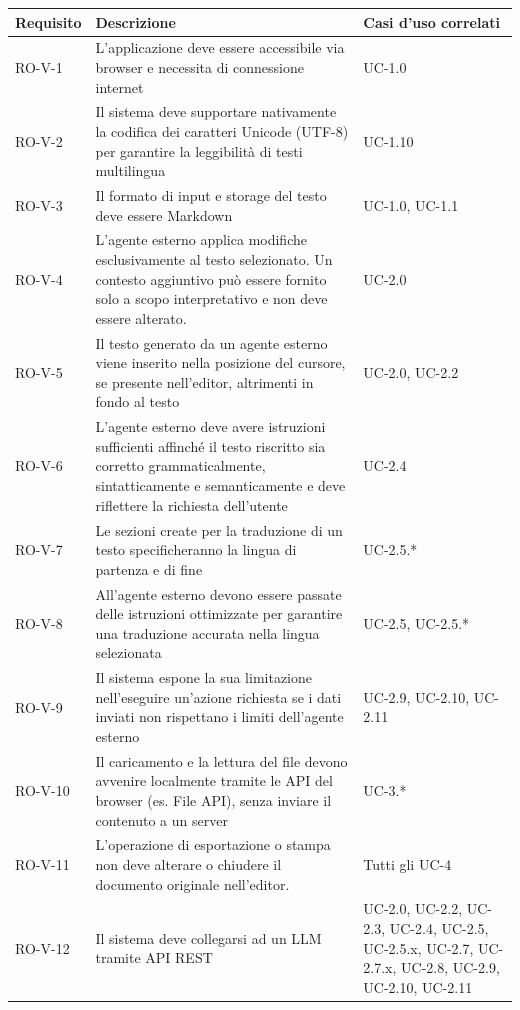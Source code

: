\documentclass[11pt,a4paper]{article}
\begin{document}
\begin{longtable}{|p{}|>{\raggedright\arraybackslash}p{}|p{}|}
\hline
\textbf{Requisito} & \textbf{Descrizione} & \textbf{Casi d'uso correlati}\\
\hline

RO-V-1 & L'applicazione deve essere accessibile via browser e necessita di connessione internet & UC-1.0 \\
\hline
RO-V-2 & Il sistema deve supportare nativamente la codifica dei caratteri Unicode (UTF-8) per garantire la leggibilità di testi multilingua & UC-1.10 \\
\hline
RO-V-3 & Il formato di input e storage del testo deve essere Markdown & UC-1.0, UC-1.1 \\
\hline
RO-V-4 & L’agente esterno applica modifiche esclusivamente al testo selezionato. Un contesto aggiuntivo può essere fornito solo a scopo interpretativo e non deve essere alterato. & UC-2.0 \\
\hline
RO-V-5 & Il testo generato da un agente esterno viene inserito nella posizione del cursore, se presente nell’editor, altrimenti in fondo al testo & UC-2.0, UC-2.2 \\
\hline
RO-V-6 & L'agente esterno deve avere istruzioni sufficienti affinché il testo riscritto sia corretto grammaticalmente, sintatticamente e semanticamente e deve riflettere la richiesta dell'utente & UC-2.4 \\
\hline
RO-V-7 & Le sezioni create per la traduzione di un testo specificheranno la lingua di partenza e di fine & UC-2.5.* \\
\hline
RO-V-8 & All'agente esterno devono essere passate delle istruzioni ottimizzate per garantire una traduzione accurata nella lingua selezionata & UC-2.5, UC-2.5.* \\
\hline
RO-V-9 & Il sistema espone la sua limitazione nell'eseguire un'azione richiesta se i dati inviati non rispettano i limiti dell'agente esterno & UC-2.9, UC-2.10, UC-2.11 \\
\hline
RO-V-10 & Il caricamento e la lettura del file devono avvenire localmente tramite le API del browser (es. File API), senza inviare il contenuto a un server & UC-3.* \\
\hline
RO-V-11 & L'operazione di esportazione o stampa non deve alterare o chiudere il documento originale nell'editor. & Tutti gli UC-4 \\
\hline
RO-V-12 & Il sistema deve collegarsi ad un LLM tramite API REST & UC-2.0, UC-2.2, UC-2.3, UC-2.4, UC-2.5, UC-2.5.x, UC-2.7, UC-2.7.x, UC-2.8, UC-2.9, UC-2.10, UC-2.11 \\

\end{longtable}
\end{document}
